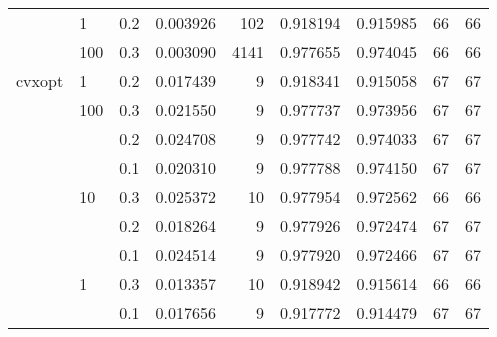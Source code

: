 \begin{table}[H]
\begin{tabular}{lllrrrrrr}
       & 1   & 0.2 &  0.003926 &     102 &  0.918194 &  0.915985 &          66 &        66 \\
       & 100 & 0.3 &  0.003090 &    4141 &  0.977655 &  0.974045 &          66 &        66 \\
cvxopt & 1   & 0.2 &  0.017439 &       9 &  0.918341 &  0.915058 &          67 &        67 \\
       & 100 & 0.3 &  0.021550 &       9 &  0.977737 &  0.973956 &          67 &        67 \\
       &     & 0.2 &  0.024708 &       9 &  0.977742 &  0.974033 &          67 &        67 \\
       &     & 0.1 &  0.020310 &       9 &  0.977788 &  0.974150 &          67 &        67 \\
       & 10  & 0.3 &  0.025372 &      10 &  0.977954 &  0.972562 &          66 &        66 \\
       &     & 0.2 &  0.018264 &       9 &  0.977926 &  0.972474 &          67 &        67 \\
       &     & 0.1 &  0.024514 &       9 &  0.977920 &  0.972466 &          67 &        67 \\
       & 1   & 0.3 &  0.013357 &      10 &  0.918942 &  0.915614 &          66 &        66 \\
       &     & 0.1 &  0.017656 &       9 &  0.917772 &  0.914479 &          67 &        67 \\
\bottomrule
\end{tabular}
\end{table}
